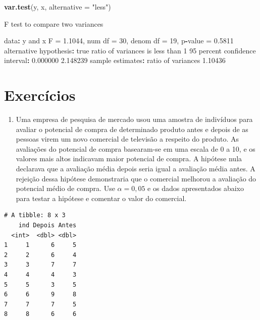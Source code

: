 \documentclass[10pt,a4paper]{book}
\newenvironment{Shaded}{\begin{snugshade}}{\end{snugshade}}
\newcommand{\KeywordTok}[1]{\textcolor[rgb]{0.13,0.29,0.53}{\textbf{#1}}}
\newcommand{\DataTypeTok}[1]{\textcolor[rgb]{0.13,0.29,0.53}{#1}}
\newcommand{\DecValTok}[1]{\textcolor[rgb]{0.00,0.00,0.81}{#1}}
\newcommand{\FloatTok}[1]{\textcolor[rgb]{0.00,0.00,0.81}{#1}}
\newcommand{\StringTok}[1]{\textcolor[rgb]{0.31,0.60,0.02}{#1}}
\newcommand{\OperatorTok}[1]{\textcolor[rgb]{0.81,0.36,0.00}{\textbf{#1}}}
\newcommand{\NormalTok}[1]{#1}
\providecommand{\tightlist}{%
  \setlength{\itemsep}{0pt}\setlength{\parskip}{0pt}}
\begin{document}
\begin{Shaded}
\begin{Highlighting}[]
\KeywordTok{var.test}\NormalTok{(y, x, }\DataTypeTok{alternative =} \StringTok{"less"}\NormalTok{)}

\NormalTok{    F test to compare two variances}

\NormalTok{data}\OperatorTok{:}\StringTok{  }\NormalTok{y and x}
\NormalTok{F =}\StringTok{ }\FloatTok{1.1044}\NormalTok{, num df =}\StringTok{ }\DecValTok{30}\NormalTok{, denom df =}\StringTok{ }\DecValTok{19}\NormalTok{, p}\OperatorTok{-}\NormalTok{value =}\StringTok{ }\FloatTok{0.5811}
\NormalTok{alternative hypothesis}\OperatorTok{:}\StringTok{ }\NormalTok{true ratio of variances is less than }\DecValTok{1}
\DecValTok{95}\NormalTok{ percent confidence interval}\OperatorTok{:}
\StringTok{ }\FloatTok{0.000000} \FloatTok{2.148239}
\NormalTok{sample estimates}\OperatorTok{:}
\NormalTok{ratio of variances }
           \FloatTok{1.10436} 
\end{Highlighting}
\end{Shaded}

\section*{Exercícios}\label{exercuxedcios-19}


\begin{enumerate}
\def\labelenumi{\arabic{enumi}.}
\tightlist
\item
  Uma empresa de pesquisa de mercado usou uma amostra de indivíduos para
  avaliar o potencial de compra de determinado produto antes e depois de
  as pessoas virem um novo comercial de televisão a respeito do produto.
  As avaliações do potencial de compra basearam-se em uma escala de 0 a
  10, e os valores mais altos indicavam maior potencial de compra. A
  hipótese nula declarava que a avaliação média depois seria igual a
  avaliação média antes. A rejeição dessa hipótese demonstraria que o
  comercial melhorou a avaliação do potencial médio de compra. Use
  \(\alpha = 0,05\) e os dados apresentados abaixo para testar a
  hipótese e comentar o valor do comercial.
\end{enumerate}

\begin{verbatim}
# A tibble: 8 x 3
    ind Depois Antes
  <int>  <dbl> <dbl>
1     1      6     5
2     2      6     4
3     3      7     7
4     4      4     3
5     5      3     5
6     6      9     8
7     7      7     5
8     8      6     6
\end{verbatim}
\end{document}

